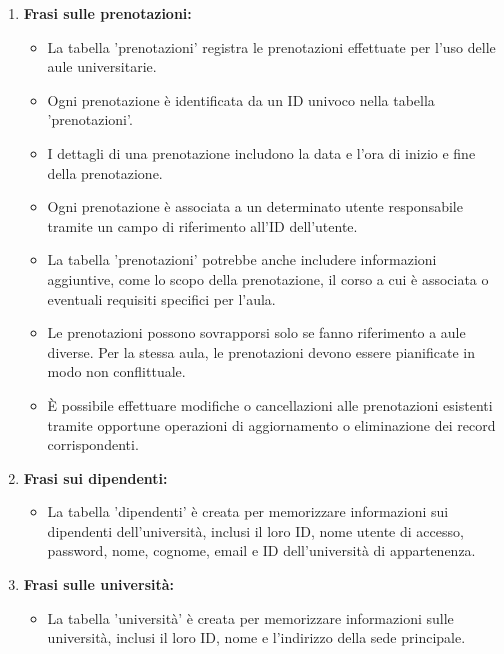 \documentclass[a4paper, 10pt, oneside]{article} %
\begin{document}
\begin{enumerate}
\begin{itemize}
\end{itemize}

\item \textbf{Frasi sulle prenotazioni:}
\begin{itemize}
    \item La tabella 'prenotazioni' registra le prenotazioni effettuate per l'uso delle aule universitarie.
    \item Ogni prenotazione è identificata da un ID univoco nella tabella 'prenotazioni'.
    \item I dettagli di una prenotazione includono la data e l'ora di inizio e fine della prenotazione.
    \item Ogni prenotazione è associata a un determinato utente  responsabile tramite un campo di riferimento all'ID dell'utente.
    \item La tabella 'prenotazioni' potrebbe anche includere informazioni aggiuntive, come lo scopo della prenotazione, il corso a cui è associata o eventuali requisiti specifici per l'aula.
    \item Le prenotazioni possono sovrapporsi solo se fanno riferimento a aule diverse. Per la stessa aula, le prenotazioni devono essere pianificate in modo non conflittuale.
    \item È possibile effettuare modifiche o cancellazioni alle prenotazioni esistenti tramite opportune operazioni di aggiornamento o eliminazione dei record corrispondenti.
\end{itemize}

\item \textbf{Frasi sui dipendenti:}

\begin{itemize}
    \item La tabella 'dipendenti' è creata per memorizzare informazioni sui dipendenti dell'università, inclusi il loro ID, nome utente di accesso, password, nome, cognome, email e ID dell'università di appartenenza.
\end{itemize}

\item \textbf{Frasi sulle università:}

\begin{itemize}
    \item La tabella 'università' è creata per memorizzare informazioni sulle università, inclusi il loro ID, nome e  l'indirizzo della sede principale.
\end{itemize}
\end{enumerate}
\end{document}
